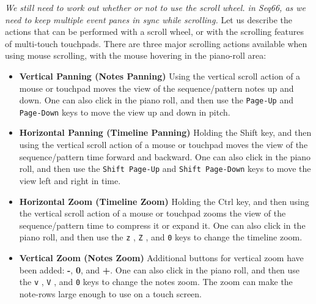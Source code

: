    \textsl{We still need to work out whether or not to use the scroll wheel.
   in Seq66, as we need to keep multiple event panes in sync while scrolling.}
   Let us describe the actions that can be performed with a
   scroll wheel, or with the scrolling features of multi-touch touchpads.
   There are three major scrolling actions available when using mouse
   scrolling, with the mouse hovering in the piano-roll area:

   \begin{itemize}
      \item \textbf{Vertical Panning (Notes Panning)}
         Using the vertical scroll action of a mouse or touchpad moves the
         view of the sequence/pattern notes up and down.
         One can also click in the piano roll, and then use the
         \texttt{Page-Up} 
         and \texttt{Page-Down} 
         keys to move the view up and down in pitch.
      \item \textbf{Horizontal Panning (Timeline Panning)}
         Holding the Shift key, and then using the vertical scroll action of a
         mouse or touchpad moves the view of the sequence/pattern time forward
         and backward.
         One can also click in the piano roll, and then use the
         \texttt{Shift Page-Up} 
         and \texttt{Shift Page-Down} 
         keys to move the view left and right in time.
      \item \textbf{Horizontal Zoom (Timeline Zoom)}
         Holding the Ctrl key, and then using the vertical scroll action of a
         mouse or touchpad zooms the view of the sequence/pattern time to
         compress it or expand it.
         One can also click in the piano roll, and then use the
         \texttt{z} ,
         \texttt{Z} , and
         \texttt{0}  keys to change the timeline zoom.
      \item \textbf{Vertical Zoom (Notes Zoom)}
         Additional buttons for vertical zoom have been added:
         \textbf{-},
         \textbf{0}, and
         \textbf{+}.
         One can also click in the piano roll, and then use the
         \texttt{v} ,
         \texttt{V} , and
         \texttt{0}  keys to change the notes zoom.
         The zoom can make the note-rows large enough to use on a touch screen.
   \end{itemize}

